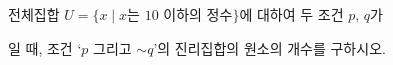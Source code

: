 전체집합 $U=\{x \mid x$는 $10$ 이하의 정수$\}$에 대하여 두 조건 $p$, $q$가 \par\smallskip{}\par\smallskip\noindent 일 때, 조건 ‘$p$ 그리고 $\sim q$’의 진리집합의 원소의 개수를 구하시오.
